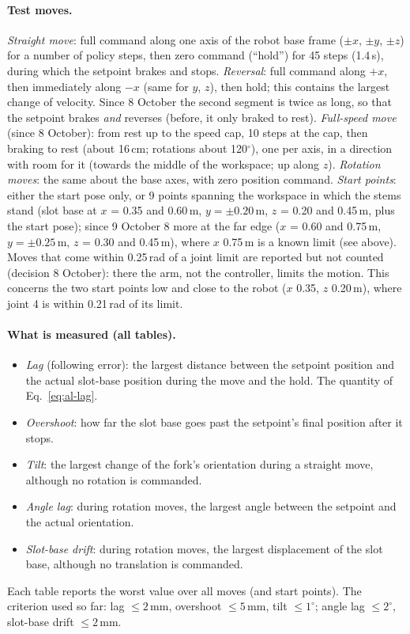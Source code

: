 \paragraph{Test moves.} \emph{Straight move}: full command along one axis of the robot base frame ($\pm x$, $\pm y$,
$\pm z$) for a number of policy steps, then zero command (``hold'') for 45 steps (1.4\,s), during which the setpoint
brakes and stops. \emph{Reversal}: full command along $+x$, then immediately along $-x$ (same for $y$, $z$), then hold;
this contains the largest change of velocity. Since 8 October the second segment is twice as long, so that the
setpoint brakes \emph{and} reverses (before, it only braked to rest). \emph{Full-speed move} (since 8 October): from
rest up to the speed cap, 10 steps at the cap, then braking to rest (about 16\,cm; rotations about 120$^\circ$),
one per axis, in a direction with room for it (towards the middle of the workspace; up along $z$).
\emph{Rotation moves}: the same about the base axes, with zero position command. \emph{Start points}: either the
start pose only, or 9 points spanning the workspace in which the stems stand (slot base at $x$ = 0.35 and 0.60\,m,
$y = \pm0.20$\,m, $z$ = 0.20 and 0.45\,m, plus the start pose); since 9 October 8 more at the far edge ($x$ = 0.60
and 0.75\,m, $y = \pm0.25$\,m, $z$ = 0.30 and 0.45\,m), where $x$ 0.75\,m is a known limit (see above). Moves that come within 0.25\,rad of a joint limit
are reported but not counted (decision 8 October): there the arm, not the controller, limits the motion. This
concerns the two start points low and close to the robot ($x$ 0.35, $z$ 0.20\,m), where joint 4 is within
0.21\,rad of its limit.

\paragraph{What is measured (all tables).}
\begin{itemize}
  \item \emph{Lag} (following error): the largest distance between the setpoint position and the actual slot-base
        position during the move and the hold. The quantity of Eq.~\eqref{eq:al-lag}.
  \item \emph{Overshoot}: how far the slot base goes past the setpoint's final position after it stops.
  \item \emph{Tilt}: the largest change of the fork's orientation during a straight move, although no rotation is
        commanded.
  \item \emph{Angle lag}: during rotation moves, the largest angle between the setpoint and the actual orientation.
  \item \emph{Slot-base drift}: during rotation moves, the largest displacement of the slot base, although no translation is
        commanded.
\end{itemize}
Each table reports the worst value over all moves (and start points). The criterion used so far: lag $\le 2$\,mm,
overshoot $\le 5$\,mm, tilt $\le 1^\circ$; angle lag $\le 2^\circ$, slot-base drift $\le 2$\,mm.

